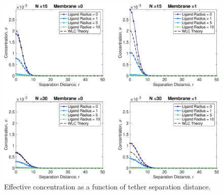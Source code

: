 \documentclass[../../AdvancementSummary.tex]{subfiles}
\begin{document}

\begin{figure}[H]
    \begin{center}
        		\includegraphics[width=0.8\linewidth]{ResultsFigures/EffectiveConcentrationKernel/ConcentrationVSSeparation.eps}
        \caption{Effective concentration as a function of tether separation distance. \label{fig: ConcVSSeparation}}
    \end{center}
\end{figure}

\end{document}
